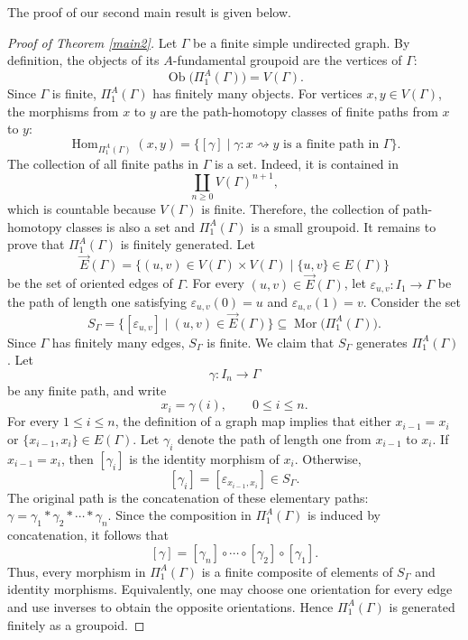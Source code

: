 \documentclass{amsart}
\begin{document}
The proof of our second main result is given below.

\begin{proof}[Proof of Theorem \ref{main2}]
Let $\Gamma$ be a finite simple undirected graph. By definition, the objects of its $A$-fundamental groupoid are the vertices of $\Gamma$:
\[
\operatorname{Ob}\bigl(\Pi_1^A(\Gamma)\bigr)=V(\Gamma).
\]
Since $\Gamma$ is finite, $\Pi_1^A(\Gamma)$ has finitely many objects. For vertices $x,y\in V(\Gamma)$, the morphisms from $x$ to $y$ are the path-homotopy classes of finite paths from $x$ to $y$:
\[
\operatorname{Hom}_{\Pi_1^A(\Gamma)}(x,y)
=
\bigl\{[\gamma]\mid
\gamma\colon x\rightsquigarrow y
\text{ is a finite path in }\Gamma
\bigr\}.
\]
The collection of all finite paths in $\Gamma$ is a set. Indeed, it is
contained in
\[
\coprod_{n\geq 0}V(\Gamma)^{n+1},
\]
which is countable because $V(\Gamma)$ is finite. Therefore, the collection of path-homotopy classes is also a set and $\Pi_1^A(\Gamma)$ is a small groupoid. It remains to prove that $\Pi_1^A(\Gamma)$ is finitely generated. Let \[\overrightarrow{E}(\Gamma)
=
\bigl\{(u,v)\in V(\Gamma)\times V(\Gamma)
\mid \{u,v\}\in E(\Gamma)\bigr\}\]
be the set of oriented edges of $\Gamma$. For every $(u,v)\in
\overrightarrow{E}(\Gamma)$, let
$ \varepsilon_{u,v}\colon I_1\longrightarrow \Gamma$
be the path of length one satisfying
$
\varepsilon_{u,v}(0)=u$ and $
\varepsilon_{u,v}(1)=v.$ Consider the set
\[
S_\Gamma=
\bigl\{[\varepsilon_{u,v}]
\mid (u,v)\in\overrightarrow{E}(\Gamma)\bigr\}
\subseteq
\operatorname{Mor}\bigl(\Pi_1^A(\Gamma)\bigr).
\]
Since $\Gamma$ has finitely many edges, $S_\Gamma$ is finite. We claim that $S_\Gamma$ generates $\Pi_1^A(\Gamma)$. Let
\[
\gamma\colon I_n\longrightarrow \Gamma
\]
be any finite path, and write
\[
x_i=\gamma(i),
\qquad 0\leq i\leq n.
\]
For every $1\leq i\leq n$, the definition of a graph map implies that
either
$
x_{i-1}=x_i
$
or
$
\{x_{i-1},x_i\}\in E(\Gamma).
$
Let $\gamma_i$ denote the path of length one from $x_{i-1}$ to $x_i$.
If $x_{i-1}=x_i$, then $[\gamma_i]$ is the identity morphism of
$x_i$. Otherwise,
\[
[\gamma_i]=[\varepsilon_{x_{i-1},x_i}]\in S_\Gamma.
\]
The original path is the concatenation of these elementary paths:
$\gamma=\gamma_1*\gamma_2*\cdots *\gamma_n.$
Since the composition in $\Pi_1^A(\Gamma)$ is induced by concatenation, it follows that
\[
[\gamma]
=
[\gamma_n]\circ\cdots\circ[\gamma_2]\circ[\gamma_1].
\]
Thus, every morphism in $\Pi_1^A(\Gamma)$ is a finite composite of elements of $S_\Gamma$ and identity morphisms. Equivalently, one may choose one orientation for every edge and use inverses to obtain the opposite orientations. Hence $\Pi_1^A(\Gamma)$ is generated finitely as a groupoid.


\end{proof}
\end{document}
